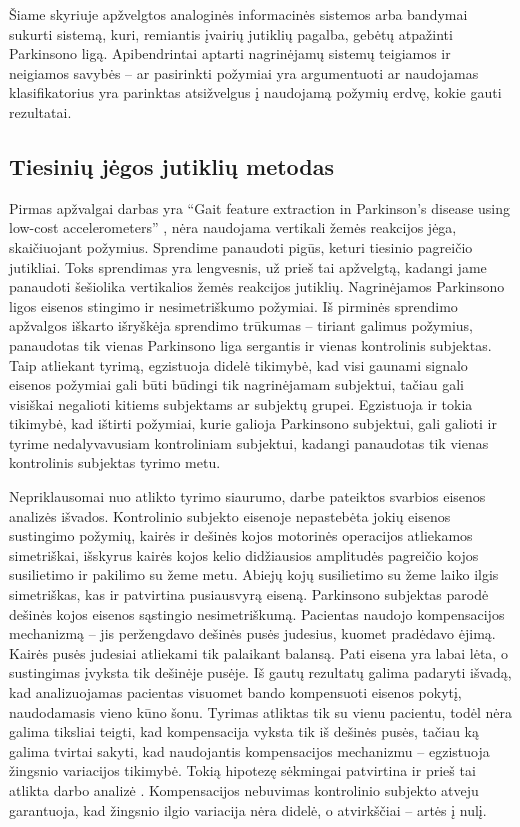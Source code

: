 \documentclass[]{vgtuef}
\begin{document}
Šiame skyriuje apžvelgtos analoginės informacinės sistemos arba bandymai sukurti sistemą, kuri, remiantis įvairių jutiklių pagalba, gebėtų atpažinti Parkinsono ligą. Apibendrintai aptarti nagrinėjamų sistemų teigiamos ir neigiamos savybės -- ar pasirinkti požymiai yra argumentuoti ar naudojamas klasifikatorius yra parinktas atsižvelgus į naudojamą požymių erdvę, kokie gauti rezultatai.

\subsection{Tiesinių jėgos jutiklių metodas}


Pirmas apžvalgai darbas yra ``Gait feature extraction in Parkinson's disease using low-cost accelerometers'' \cite{6091948}, nėra naudojama vertikali žemės reakcijos jėga, skaičiuojant požymius. Sprendime panaudoti pigūs, keturi tiesinio pagreičio jutikliai. Toks sprendimas yra lengvesnis, už prieš tai apžvelgtą, kadangi jame panaudoti šešiolika vertikalios žemės reakcijos jutiklių. Nagrinėjamos Parkinsono ligos eisenos stingimo ir nesimetriškumo požymiai. Iš pirminės sprendimo apžvalgos iškarto išryškėja sprendimo trūkumas -- tiriant galimus požymius, panaudotas tik vienas Parkinsono liga sergantis ir vienas kontrolinis subjektas. Taip atliekant tyrimą, egzistuoja didelė tikimybė, kad visi gaunami signalo eisenos požymiai gali būti būdingi tik nagrinėjamam subjektui, tačiau gali visiškai negalioti kitiems subjektams ar subjektų grupei. Egzistuoja ir tokia tikimybė, kad ištirti požymiai, kurie galioja Parkinsono subjektui, gali galioti ir tyrime nedalyvavusiam kontroliniam subjektui, kadangi panaudotas tik vienas kontrolinis subjektas tyrimo metu.

Nepriklausomai nuo atlikto tyrimo siaurumo, darbe pateiktos svarbios eisenos analizės išvados. Kontrolinio subjekto eisenoje nepastebėta jokių eisenos sustingimo požymių, kairės ir dešinės kojos motorinės operacijos atliekamos simetriškai, išskyrus kairės kojos kelio didžiausios amplitudės pagreičio kojos susilietimo ir pakilimo su žeme metu. Abiejų kojų susilietimo su žeme laiko ilgis simetriškas, kas ir patvirtina pusiausvyrą eiseną. Parkinsono subjektas parodė dešinės kojos eisenos sąstingio nesimetriškumą. Pacientas naudojo kompensacijos mechanizmą -- jis peržengdavo dešinės pusės judesius, kuomet pradėdavo ėjimą. Kairės pusės judesiai atliekami tik palaikant balansą. Pati eisena yra labai lėta, o sustingimas įvyksta tik dešinėje pusėje. Iš gautų rezultatų galima padaryti išvadą, kad analizuojamas pacientas visuomet bando kompensuoti eisenos pokytį, naudodamasis vieno kūno šonu. Tyrimas atliktas tik su vienu pacientu, todėl nėra galima tiksliai teigti, kad kompensacija vyksta tik iš dešinės pusės, tačiau ką galima tvirtai sakyti, kad naudojantis kompensacijos mechanizmu -- egzistuoja žingsnio variacijos tikimybė. Tokią hipotezę sėkmingai patvirtina ir prieš tai atlikta darbo analizė \cite{5280353}. Kompensacijos nebuvimas kontrolinio subjekto atveju garantuoja, kad žingsnio ilgio variacija nėra didelė, o atvirkščiai -- artės į nulį.
\end{document}
